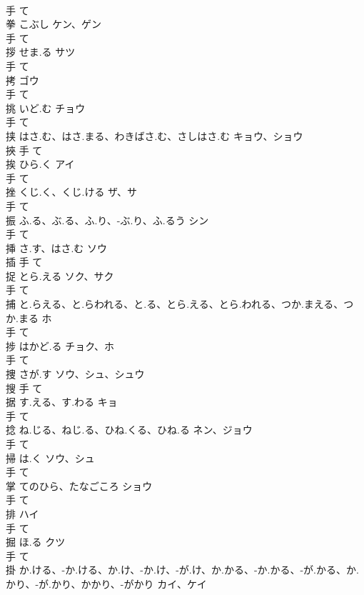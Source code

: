 \documentclass[8pt]{extreport}
\begin{document}
\begin{CJK}{UTF8}{min}
\\	手		て		
\\	拳	こぶし	ケン、ゲン	
\\	手		て		
\\	拶	せま.る	サツ	
\\	手		て		
\\	拷		ゴウ	
\\	手		て		
\\	挑	いど.む	チョウ	
\\	手		て		
\\	挟	はさ.む、はさ.まる、わきばさ.む、さしはさ.む	キョウ、ショウ	
\\	挾	手		て		
\\	挨	ひら.く	アイ	
\\	手		て		
\\	挫	くじ.く、くじ.ける	ザ、サ	
\\	手		て		
\\	振	ふ.る、ぶ.る、ふ.り、-ぶ.り、ふ.るう	シン	
\\	手		て		
\\	挿	さ.す、はさ.む	ソウ	
\\	插	手		て		
\\	捉	とら.える	ソク、サク	
\\	手		て		
\\	捕	と.らえる、と.らわれる、と.る、とら.える、とら.われる、つか.まえる、つか.まる	ホ	
\\	手		て		
\\	捗	はかど.る	チョク、ホ	
\\	手		て		
\\	捜	さが.す	ソウ、シュ、シュウ	
\\	搜	手		て		
\\	据	す.える、す.わる	キョ	
\\	手		て		
\\	捻	ね.じる、ねじ.る、ひね.くる、ひね.る	ネン、ジョウ	
\\	手		て		
\\	掃	は.く	ソウ、シュ	
\\	手		て		
\\	掌	てのひら、たなごころ	ショウ	
\\	手		て		
\\	排		ハイ	
\\	手		て		
\\	掘	ほ.る	クツ	
\\	手		て		
\\	掛	か.ける、-か.ける、か.け、-か.け、-が.け、か.かる、-か.かる、-が.かる、か.かり、-が.かり、かかり、-がかり	カイ、ケイ	

\end{CJK}
\end{document}
